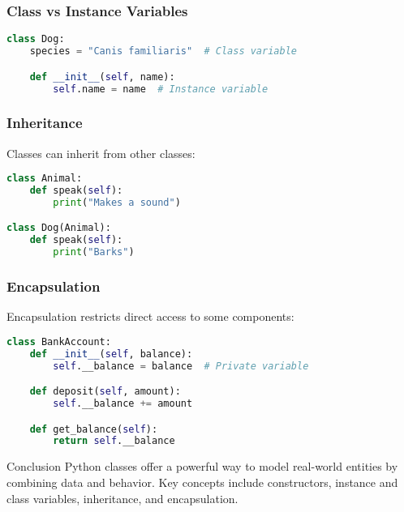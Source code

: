 \begin{frame}[fragile]
\frametitle{Class vs Instance Variables}
\begin{lstlisting}[language=python]
class Dog:
    species = "Canis familiaris"  # Class variable

    def __init__(self, name):
        self.name = name  # Instance variable
\end{lstlisting}
\end{frame}



\begin{frame}[fragile]
\frametitle{Inheritance}
Classes can inherit from other classes:

\begin{lstlisting}[language=python]
class Animal:
    def speak(self):
        print("Makes a sound")

class Dog(Animal):
    def speak(self):
        print("Barks")
\end{lstlisting}
\end{frame}

\begin{frame}[fragile]
\frametitle{Encapsulation}
Encapsulation restricts direct access to some components:
\begin{lstlisting}[language=python]
class BankAccount:
    def __init__(self, balance):
        self.__balance = balance  # Private variable

    def deposit(self, amount):
        self.__balance += amount

    def get_balance(self):
        return self.__balance
\end{lstlisting}
\end{frame}

\begin{frame}{Conclusion}
Python classes offer a powerful way to model real-world entities by combining data and behavior. Key concepts include constructors, instance and class variables, inheritance, and encapsulation.
\end{frame}
